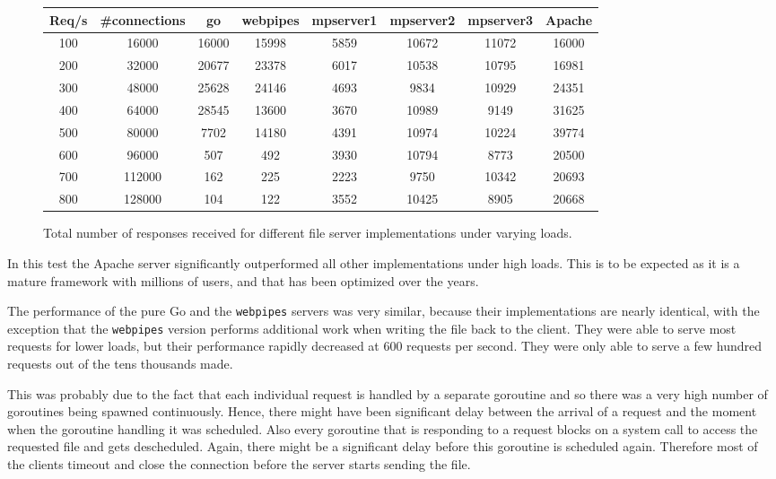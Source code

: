 \begin{figure}[h]
\begin{center}
\begin{adjustwidth}{-.5in}{-.5in} 
\begin{tabular}{|c|c|c|c|c|c|c|c|}
\hline
Req/s & \#connections & go    & webpipes & mpserver1 & mpserver2 & mpserver3 & Apache \\
\hline
100   & 16000        & 16000 & 15998    & 5859      & 10672     & 11072     & 16000 \\
200   & 32000        & 20677 & 23378    & 6017      & 10538     & 10795     & 16981 \\
300   & 48000        & 25628 & 24146    & 4693      & 9834      & 10929     & 24351 \\
400   & 64000        & 28545 & 13600    & 3670      & 10989     & 9149      & 31625 \\
500   & 80000        & 7702  & 14180    & 4391      & 10974     & 10224     & 39774 \\
600   & 96000        & 507   & 492      & 3930      & 10794     & 8773      & 20500 \\
700   & 112000       & 162   & 225      & 2223      & 9750      & 10342     & 20693 \\
800   & 128000       & 104   & 122      & 3552      & 10425     & 8905      & 20668 \\
\hline
\end{tabular}
\end{adjustwidth}
\end{center}
\caption{Total number of responses received for different file server implementations under varying loads.}
\label{results2}
\end{figure}

In this test the Apache server significantly outperformed all other implementations under 
high loads. This is to be expected as it is a mature framework with millions of users, and that has 
been optimized over the years.

The performance of the pure Go and the \texttt{webpipes} servers was very similar, because their implementations are nearly identical, with the exception
that the \texttt{webpipes} version performs additional work when writing the file back to 
the client. They were able to serve most requests for lower loads, but their performance
rapidly decreased at 600 requests per second. They were only able to serve a few hundred requests
out of the tens thousands made. 

This was probably due to the fact that each individual request is handled by a 
separate goroutine and so there was a very high number of goroutines being spawned
continuously. Hence, there might have been significant delay between the arrival of 
a request and the moment when the goroutine handling it was scheduled. 
Also every goroutine that is responding to a request blocks on a system call to 
access the requested file and gets descheduled. Again, there might be a significant
delay before this goroutine is scheduled again. Therefore most of the clients 
timeout and close the connection before the server starts sending the file.

